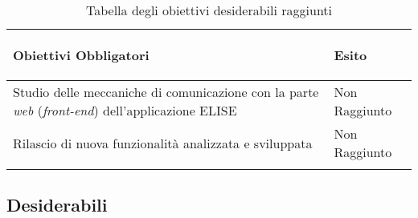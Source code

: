 	\begin{center}
		  \bgroup
		  \def\arraystretch{1.4}
		   \begin{longtable}{ | p{9cm} | p{2cm} | }  \hline
		   \label{TabellaObiettiviFacoltativiRaggiunti}
			 
			 \cellcolor[gray]{0.9} \textbf{Obiettivi Obbligatori} & \cellcolor[gray]{0.9} \textbf{Esito} \\ \hline
						 
			Studio delle meccaniche di comunicazione con la parte \textit{web} (\textit{front-end}) dell'applicazione ELISE & Non Raggiunto  \\ \hline
			Rilascio di nuova funzionalità analizzata e sviluppata  & Non Raggiunto  \\ \hline

			
			\caption{Tabella degli obiettivi desiderabili raggiunti}
			
		    \end{longtable}
		  \egroup
		\end{center}

\newpage

\subsection{Desiderabili}

